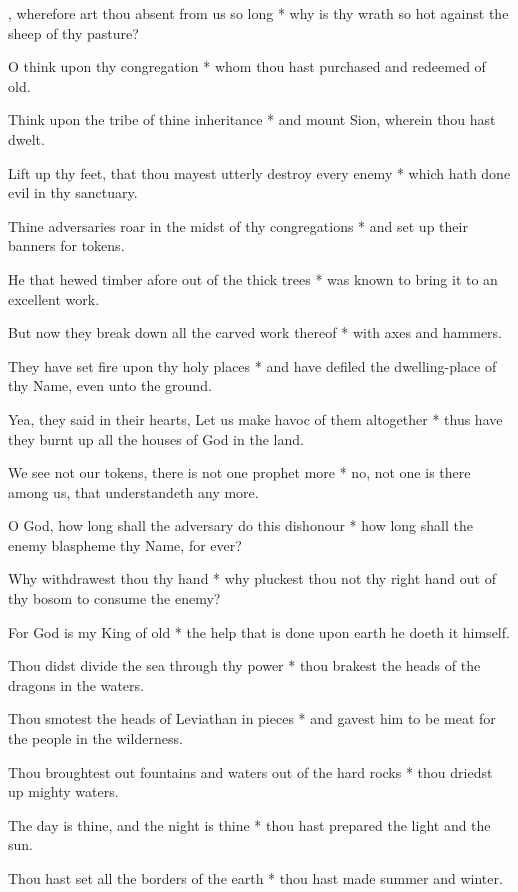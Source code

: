 
, wherefore art thou absent from us so long * why is thy wrath so hot against the sheep of thy pasture?

O think upon thy congregation * whom thou hast purchased and redeemed of old.

Think upon the tribe of thine inheritance * and mount Sion, wherein thou hast dwelt.

Lift up thy feet, that thou mayest utterly destroy every enemy * which hath done evil in thy sanctuary.

Thine adversaries roar in the midst of thy congregations * and set up their banners for tokens.

He that hewed timber afore out of the thick trees * was known to bring it to an excellent work.

But now they break down all the carved work thereof * with axes and hammers.

They have set fire upon thy holy places * and have defiled the dwelling-place of thy Name, even unto the ground.

Yea, they said in their hearts, Let us make havoc of them altogether * thus have they burnt up all the houses of God in the land.

We see not our tokens, there is not one prophet more * no, not one is there among us, that understandeth any more.

O God, how long shall the adversary do this dishonour * how long shall the enemy blaspheme thy Name, for ever?

Why withdrawest thou thy hand * why pluckest thou not thy right hand out of thy bosom to consume the enemy?

For God is my King of old * the help that is done upon earth he doeth it himself.

Thou didst divide the sea through thy power * thou brakest the heads of the dragons in the waters.

Thou smotest the heads of Leviathan in pieces * and gavest him to be meat for the people in the wilderness.

Thou broughtest out fountains and waters out of the hard rocks * thou driedst up mighty waters.

The day is thine, and the night is thine * thou hast prepared the light and the sun.

Thou hast set all the borders of the earth * thou hast made summer and winter.

